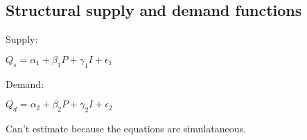 
\subsection{Structural supply and demand functions}

Supply:

\(Q_s=\alpha_1 + \beta_1P+\gamma_1I + \epsilon_1\)

Demand:

\(Q_d=\alpha_2 + \beta_2P+\gamma_2I + \epsilon_2\)

Can't estimate because the equations are simulataneous.

